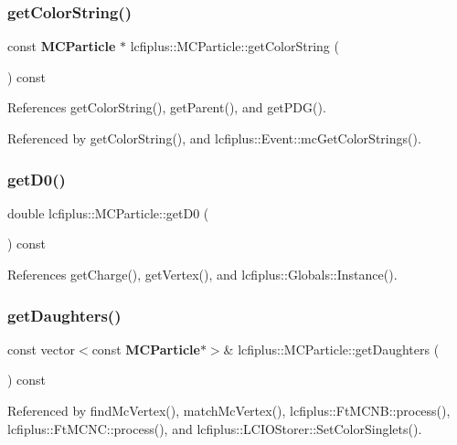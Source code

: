 \subsubsection{get\+Color\+String()}
{\footnotesize\ttfamily const \textbf{ M\+C\+Particle} $\ast$ lcfiplus\+::\+M\+C\+Particle\+::get\+Color\+String (\begin{DoxyParamCaption}{ }\end{DoxyParamCaption}) const}



References get\+Color\+String(), get\+Parent(), and get\+P\+D\+G().



Referenced by get\+Color\+String(), and lcfiplus\+::\+Event\+::mc\+Get\+Color\+Strings().

\mbox{\label{classlcfiplus_1_1MCParticle_a8a0a07011c31a45b8296ccec78d78b06}} 
\subsubsection{get\+D0()}
{\footnotesize\ttfamily double lcfiplus\+::\+M\+C\+Particle\+::get\+D0 (\begin{DoxyParamCaption}{ }\end{DoxyParamCaption}) const}



References get\+Charge(), get\+Vertex(), and lcfiplus\+::\+Globals\+::\+Instance().

\mbox{\label{classlcfiplus_1_1MCParticle_a0307973c0d00d29df43f8eb1699ccf15}} 
\subsubsection{get\+Daughters()}
{\footnotesize\ttfamily const vector$<$const \textbf{ M\+C\+Particle}$\ast$$>$\& lcfiplus\+::\+M\+C\+Particle\+::get\+Daughters (\begin{DoxyParamCaption}{ }\end{DoxyParamCaption}) const\hspace{0.3cm}{\ttfamily [inline]}}



Referenced by find\+Mc\+Vertex(), match\+Mc\+Vertex(), lcfiplus\+::\+Ft\+M\+C\+N\+B\+::process(), lcfiplus\+::\+Ft\+M\+C\+N\+C\+::process(), and lcfiplus\+::\+L\+C\+I\+O\+Storer\+::\+Set\+Color\+Singlets().

